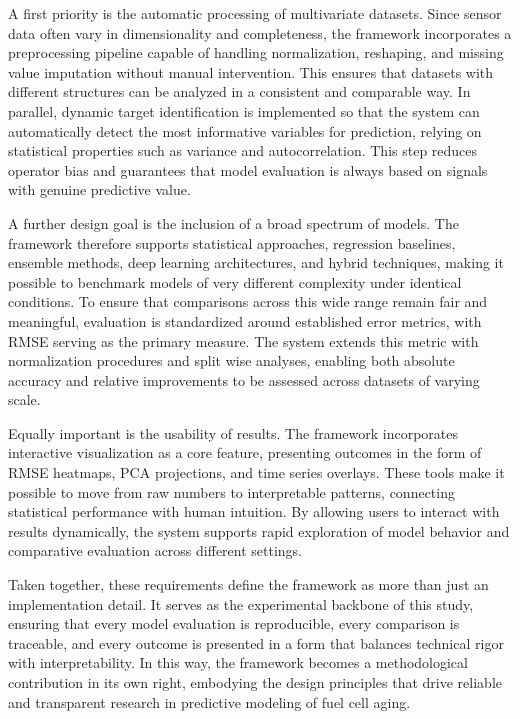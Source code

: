 A first priority is the automatic processing of multivariate datasets. Since sensor data often vary in dimensionality and completeness, the framework incorporates a preprocessing pipeline capable of handling normalization, reshaping, and missing value imputation without manual intervention. This ensures that datasets with different structures can be analyzed in a consistent and comparable way. In parallel, dynamic target identification is implemented so that the system can automatically detect the most informative variables for prediction, relying on statistical properties such as variance and autocorrelation. This step reduces operator bias and guarantees that model evaluation is always based on signals with genuine predictive value.

A further design goal is the inclusion of a broad spectrum of models. The framework therefore supports statistical approaches, regression baselines, ensemble methods, deep learning architectures, and hybrid techniques, making it possible to benchmark models of very different complexity under identical conditions. To ensure that comparisons across this wide range remain fair and meaningful, evaluation is standardized around established error metrics, with RMSE serving as the primary measure. The system extends this metric with normalization procedures and split wise analyses, enabling both absolute accuracy and relative improvements to be assessed across datasets of varying scale.   

Equally important is the usability of results. The framework incorporates interactive visualization as a core feature, presenting outcomes in the form of RMSE heatmaps, PCA projections, and time series overlays. These tools make it possible to move from raw numbers to interpretable patterns, connecting statistical performance with human intuition. By allowing users to interact with results dynamically, the system supports rapid exploration of model behavior and comparative evaluation across different settings.

Taken together, these requirements define the framework as more than just an implementation detail. It serves as the experimental backbone of this study, ensuring that every model evaluation is reproducible, every comparison is traceable, and every outcome is presented in a form that balances technical rigor with interpretability. In this way, the framework becomes a methodological contribution in its own right, embodying the design principles that drive reliable and transparent research in predictive modeling of fuel cell aging.

